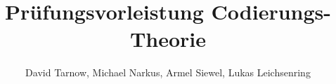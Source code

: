 \documentclass[12pt, titlepage]{article}
\begin{document}
	\begin{titlepage}
		\title{Prüfungsvorleistung Codierungs-Theorie}
		\author{David Tarnow, Michael Narkus, Armel Siewel, Lukas Leichsenring}
		\maketitle
		\tableofcontents
	\end{titlepage}

	
	
	
	
	
	
	
	\lstlistoflistings
	
\end{document}
